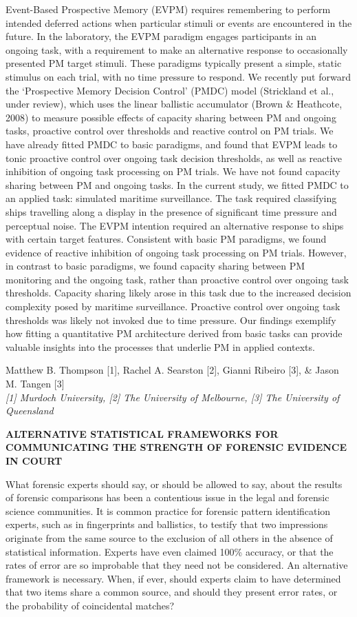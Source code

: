 \documentclass[]{article}
\begin{document}
Event-Based Prospective Memory (EVPM) requires remembering to perform
intended deferred actions when particular stimuli or events are
encountered in the future. In the laboratory, the EVPM paradigm engages
participants in an ongoing task, with a requirement to make an
alternative response to occasionally presented PM target stimuli. These
paradigms typically present a simple, static stimulus on each trial,
with no time pressure to respond. We recently put forward the
`Prospective Memory Decision Control' (PMDC) model (Strickland et al.,
under review), which uses the linear ballistic accumulator (Brown \&
Heathcote, 2008) to measure possible effects of capacity sharing between
PM and ongoing tasks, proactive control over thresholds and reactive
control on PM trials. We have already fitted PMDC to basic paradigms,
and found that EVPM leads to tonic proactive control over ongoing task
decision thresholds, as well as reactive inhibition of ongoing task
processing on PM trials. We have not found capacity sharing between PM
and ongoing tasks. In the current study, we fitted PMDC to an applied
task: simulated maritime surveillance. The task required classifying
ships travelling along a display in the presence of significant time
pressure and perceptual noise. The EVPM intention required an
alternative response to ships with certain target features. Consistent
with basic PM paradigms, we found evidence of reactive inhibition of
ongoing task processing on PM trials. However, in contrast to basic
paradigms, we found capacity sharing between PM monitoring and the
ongoing task, rather than proactive control over ongoing task
thresholds. Capacity sharing likely arose in this task due to the
increased decision complexity posed by maritime surveillance. Proactive
control over ongoing task thresholds was likely not invoked due to time
pressure. Our findings exemplify how fitting a quantitative PM
architecture derived from basic tasks can provide valuable insights into
the processes that underlie PM in applied contexts.\\
\pagebreak  

Matthew B. Thompson {[}1{]}, Rachel A. Searston {[}2{]}, Gianni Ribeiro
{[}3{]}, \& Jason M. Tangen {[}3{]}\\
\emph{{[}1{]} Murdoch University, {[}2{]} The University of Melbourne,
{[}3{]} The University of Queensland}

\textbf{ALTERNATIVE STATISTICAL FRAMEWORKS FOR COMMUNICATING THE
STRENGTH OF FORENSIC EVIDENCE IN COURT}

What forensic experts should say, or should be allowed to say, about the
results of forensic comparisons has been a contentious issue in the
legal and forensic science communities. It is common practice for
forensic pattern identification experts, such as in fingerprints and
ballistics, to testify that two impressions originate from the same
source to the exclusion of all others in the absence of statistical
information. Experts have even claimed 100\% accuracy, or that the rates
of error are so improbable that they need not be considered. An
alternative framework is necessary. When, if ever, should experts claim
to have determined that two items share a common source, and should they
present error rates, or the probability of coincidental matches?
\end{document}
